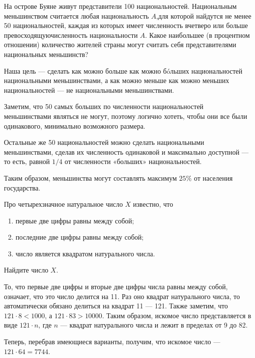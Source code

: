 
\begin{itemize}

	\itB На острове Буяне живут представители 100 национальностей. Национальным меньшинством считается любая национальность $A$,\linebreak для которой найдутся не менее 50 национальностей, каждая из которых имеет численность вчетверо или больше превосходящую\linebreak численность национальности $A$. Какое наибольшее (в процентном отношении) количество жителей страны могут считать себя представителями национальных меньшинств?
	
	\itr Наша цель — сделать как можно больше как можно б\'oльших национальностей национальными меньшинствами, а как можно меньше как можно меньших национальностей — не национальными меньшинствами.
	
	Заметим, что 50 самых больших по численности национальностей меньшинствами являться не могут, поэтому логично хотеть, чтобы они все были одинакового, минимально возможного размера.
	
	Остальные же 50 национальностей можно сделать национальными меньшинствами, сделав их численность одинаковой и максимально доступной — то есть, равной $1/4$ от численности «больших» национальностей.
	
	Таким образом, меньшинства могут составлять максимум $25\%$ от населения государства.

	\itC Про четырехзначное натуральное число $X$ известно, что
	
	\begin{enumerate}[label=\arabic*)]
		\item первые две цифры равны между собой;
		\item последние две цифры равны между собой;
		\item число является квадратом натурального числа.
	\end{enumerate}
	
	Найдите число $X$.
	
	\itr То, что первые две цифры и вторые две цифры числа равны между собой, означает, что это число делится на 11. Раз оно квадрат натурального числа, то автоматически обязано делиться на квадрат 11 — 121. Также заметим, что $121 \cdot 8 < 1000$, а $121 \cdot 83 > 10000$. Таким образом, искомое число представляется в виде $121 \cdot n$, где $n$ — квадрат натурального числа и лежит в пределах от 9 до 82.
	
	Теперь, перебрав имеющиеся варианты, получим, что искомое число — $121 \cdot 64 = 7744$.
	
\end{itemize}